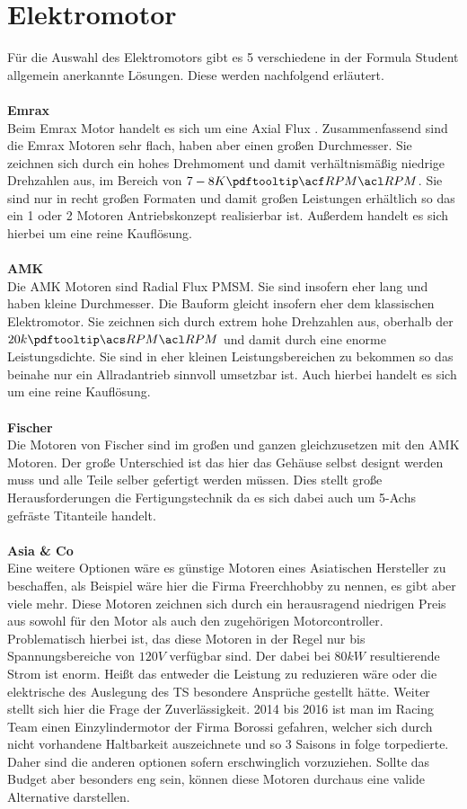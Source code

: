 \section{Elektromotor}
Für die Auswahl des Elektromotors gibt es 5 verschiedene in der Formula Student allgemein anerkannte Lösungen. Diese werden nachfolgend erläutert.\\
\\
\textbf{Emrax}\\
Beim Emrax Motor handelt es sich um eine Axial Flux . Zusammenfassend sind die Emrax Motoren sehr flach, haben aber einen großen Durchmesser. Sie zeichnen sich durch ein hohes Drehmoment und damit verhältnismäßig niedrige Drehzahlen aus, im Bereich von \ensuremath{7-8K \acfirst{RPM}}. Sie sind nur in recht großen Formaten und damit großen Leistungen erhältlich so das ein 1 oder 2 Motoren Antriebskonzept realisierbar ist. Außerdem handelt es sich hierbei um eine reine Kauflösung. \\
\\
\textbf{AMK}\\
Die AMK Motoren sind Radial Flux \ac{PMSM}. Sie sind insofern eher lang und haben kleine Durchmesser. Die Bauform gleicht insofern eher dem klassischen Elektromotor. Sie zeichnen sich durch extrem hohe Drehzahlen aus, oberhalb der \ensuremath{20k\ac{RPM}} und damit durch eine enorme Leistungsdichte. Sie sind in eher kleinen Leistungsbereichen zu bekommen so das beinahe nur ein Allradantrieb sinnvoll umsetzbar ist. Auch hierbei handelt es sich um eine reine Kauflösung. \\
\\
\textbf{Fischer}\\
Die Motoren von Fischer sind im großen und ganzen gleichzusetzen mit den AMK Motoren. Der große Unterschied ist das hier das Gehäuse selbst designt werden muss und alle Teile selber gefertigt werden müssen. Dies stellt große Herausforderungen die Fertigungstechnik da es sich dabei auch um 5-Achs gefräste Titanteile handelt.\\
\\
\textbf{Asia \& Co}\\
Eine weitere Optionen wäre es günstige Motoren eines Asiatischen Hersteller zu beschaffen, als Beispiel wäre hier die Firma Freerchhobby zu nennen, es gibt aber viele mehr. Diese Motoren zeichnen sich durch ein herausragend niedrigen Preis aus sowohl für den Motor als auch den zugehörigen Motorcontroller. Problematisch hierbei ist, das diese Motoren in der Regel nur bis Spannungsbereiche von \ensuremath{120 V} verfügbar sind. Der dabei bei \ensuremath{80 kW} resultierende Strom ist enorm. Heißt das entweder die Leistung zu reduzieren wäre oder die elektrische des Auslegung des \ac{TS} besondere Ansprüche gestellt hätte. Weiter stellt sich hier die Frage der Zuverlässigkeit. 2014 bis 2016 ist man im Racing Team einen Einzylindermotor der Firma Borossi gefahren, welcher sich durch nicht vorhandene Haltbarkeit auszeichnete und so 3 Saisons in folge torpedierte. Daher sind die anderen optionen sofern erschwinglich vorzuziehen. Sollte das Budget aber besonders eng sein, können diese Motoren durchaus eine valide Alternative darstellen.\\
